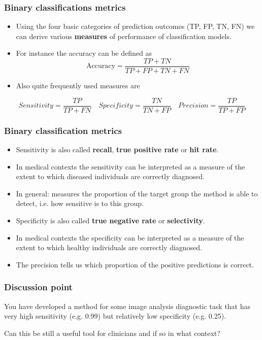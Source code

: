 \documentclass[notes]{beamer}          %
\begin{document}
\begin{frame}
 \frametitle{Binary classifications metrics}
    \begin{itemize}
        \item Using the four basic categories of prediction outcomes (TP, FP, TN, FN) we can derive various {\bf  measures} of performance of classification models.
        \item For instance the accuracy can be defined as
        $$\mbox{Accuracy} = \frac{TP+TN}{TP+FP+TN+FN}$$
        \item Also quite frequently used measures are \\

    \end{itemize}
    \small{
        $$Sensitivity = \frac{TP}{TP+FN} \hspace{1em} Specificity = \frac{TN}{TN+FP} \hspace{1em} Precision = \frac{TP}{TP+FP}$$
        }
\end{frame}


\begin{frame}
\frametitle{Binary classification metrics}
    \begin{itemize}
        \item Sensitivity is also called {\bf recall}, {\bf true positive rate} or {\bf hit rate}.
        \item In medical contexts the sensitivity can be interpreted as a measure of the extent to which diseased individuals are correctly diagnosed.
        \item In general: measures the proportion of the target group the method is able to detect, i.e. how sensitive is to this group.
        \item Specificity is also called {\bf true negative rate} or {\bf selectivity}.
        \item In medical contexts the specificity can be interpreted as a measure of the extent to which healthy individuals are correctly diagnosed.
        \item The precision tells us which proportion of the positive predictions is correct.
    \end{itemize}
\end{frame}

\begin{frame}
\frametitle{Discussion point}
You have developed a method for some image analysis diagnostic task that has very high sensitivity (e.g. 0.99) but relatively low specificity (e.g. 0.25). 

Can this be still a useful tool for clinicians and if so in what context? \end{frame}
\end{document}

